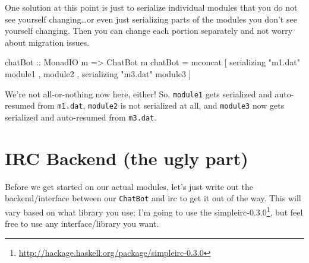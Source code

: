 \documentclass[]{article}
\newenvironment{Shaded}{}{}
\newcommand{\DataTypeTok}[1]{\textcolor[rgb]{0.56,0.13,0.00}{#1}}
\newcommand{\FunctionTok}[1]{\textcolor[rgb]{0.02,0.16,0.49}{#1}}
\newcommand{\NormalTok}[1]{#1}
\newcommand{\OtherTok}[1]{\textcolor[rgb]{0.00,0.44,0.13}{#1}}
\newcommand{\StringTok}[1]{\textcolor[rgb]{0.25,0.44,0.63}{#1}}
\renewcommand{\href}[2]{#2\footnote{\url{#1}}}
\begin{document}
One solution at this point is just to serialize individual modules that you do
not see yourself changing\ldots or even just serializing parts of the modules
you don't see yourself changing. Then you can change each portion separately and
not worry about migration issues.

\begin{Shaded}
\begin{Highlighting}[]
\OtherTok{chatBot ::} \DataTypeTok{MonadIO}\NormalTok{ m }\OtherTok{=\textgreater{}} \DataTypeTok{ChatBot}\NormalTok{ m}
\NormalTok{chatBot }\OtherTok{=} \FunctionTok{mconcat}\NormalTok{ [ serializing\textquotesingle{} }\StringTok{"m1.dat"}\NormalTok{ module1}
\NormalTok{                  , module2}
\NormalTok{                  , serializing\textquotesingle{} }\StringTok{"m3.dat"}\NormalTok{ module3}
\NormalTok{                  ]}
\end{Highlighting}
\end{Shaded}

We're not all-or-nothing now here, either! So, \texttt{module1} gets serialized
and auto-resumed from \texttt{m1.dat}, \texttt{module2} is not serialized at
all, and \texttt{module3} now gets serialized and auto-resumed from
\texttt{m3.dat}.

\section{IRC Backend (the ugly part)}\label{irc-backend-the-ugly-part}

Before we get started on our actual modules, let's just write out the
backend/interface between our \texttt{ChatBot} and irc to get it out of the way.
This will vary based on what library you use; I'm going to use the
\href{http://hackage.haskell.org/package/simpleirc-0.3.0}{simpleirc-0.3.0}, but
feel free to use any interface/library you want.
\end{document}
